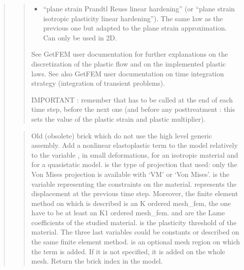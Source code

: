 \documentclass[a4paper,11pt,english]{sphinxmanual}
\begin{document}
\begin{quote}
\begin{quote}
\begin{itemize}
\item {} 
\sphinxAtStartPar
“plane strain Prandtl Reuss linear hardening”
(or “plane strain isotropic plasticity linear hardening”).
The same law as the previous one but adapted to the plane strain
approximation. Can only be used in 2D.

\end{itemize}

\sphinxAtStartPar
See GetFEM user documentation for further explanations on the
discretization of the plastic flow and on the implemented plastic laws.
See also GetFEM user documentation on time integration strategy
(integration of transient problems).

\sphinxAtStartPar
IMPORTANT : remember that  has
to be called at the end of each time step, before the next one
(and before any post\sphinxhyphen{}treatment : this sets the value of the plastic
strain and plastic multiplier).
\end{quote}

\sphinxAtStartPar
{}
\begin{quote}

\sphinxAtStartPar
Old (obsolete) brick which do not use the high level generic
assembly. Add a nonlinear elastoplastic term to the model relatively
to the variable , in small deformations, for an isotropic
material and for a quasistatic model.  is the type of
projection that used: only the Von Mises projection is
available with ‘VM’ or ‘Von Mises’.
 is the variable representing the constraints on the material.
 represents the displacement at the previous time step.
Moreover, the finite element method on which  is described
is an K ordered mesh\_fem, the  one have to be at least
an K\sphinxhyphen{}1 ordered mesh\_fem.
 and  are the Lame coefficients of the studied
material.
 is the plasticity threshold of the material.
The three last variables could be constants or described on the
same finite element method.
 is an optional mesh region on which the term is added.
If it is not specified, it is added on the whole mesh.
Return the brick index in the model.
\end{quote}


\end{quote}
\end{document}

